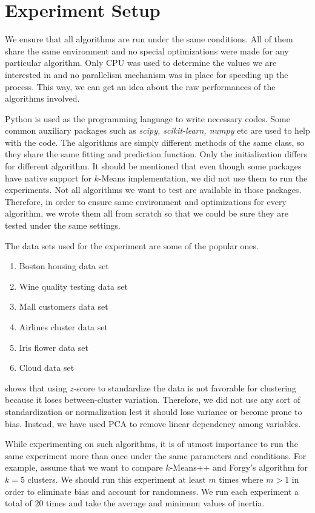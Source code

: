 \documentclass[twoside, 11pt]{article}
\begin{document}
	\section{Experiment Setup}
	We ensure that all algorithms are run under the same conditions. All of them share the same environment and no special optimizations were made for any particular algorithm. Only CPU was used to determine the values we are interested in and no parallelism mechanism was in place for speeding up the process. This way, we can get an idea about the raw performances of the algorithms involved.
	
	Python is used as the programming language to write necessary codes. Some common auxiliary packages such as \textit{scipy, scikit-learn, numpy} etc are used to help with the code. The algorithms are simply different methods of the same class, so they share the same fitting and prediction function. Only the initialization differs for different algorithm. It should be mentioned that even though some packages have native support for $k$-Means implementation, we did not use them to run the experiments. Not all algorithms we want to test are available in those packages. Therefore, in order to ensure same environment and optimizations for every algorithm, we wrote them all from scratch so that we could be sure they are tested under the same settings.
	
	The data sets used for the experiment are some of the popular ones.
		\begin{enumerate}
			\item Boston housing data set
			\item Wine quality testing data set
			\item Mall customers data set
			\item Airlines cluster data set
			\item Iris flower data set
			\item Cloud data set
		\end{enumerate}
	\cite{miligan} shows that using $z$-score to standardize the data is not favorable for clustering because it loses between-cluster variation. Therefore, we did not use any sort of standardization or normalization lest it should lose variance or become prone to bias. Instead, we have used PCA to remove linear dependency among variables. 
	
	While experimenting on such algorithms, it is of utmost importance to run the same experiment more than once under the same parameters and conditions. For example, assume that we want to compare $k$-Means++ and Forgy's algorithm \citep{forgy} for $k=5$ clusters. We should run this experiment at least $m$ times where $m>1$ in order to eliminate bias and account for randomness. We run each experiment a total of $20$ times and take the average and minimum values of inertia.
	
\end{document}
